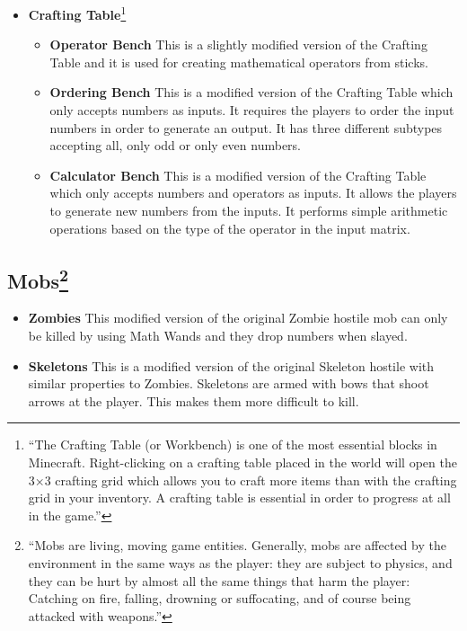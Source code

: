 \begin{itemize}
\large \item \textbf{Crafting Table}\footnote{``The Crafting Table (or Workbench) is one of the most essential blocks in Minecraft. Right-clicking on a crafting table placed in the world will open the 3×3 crafting grid which allows you to craft more items than with the crafting grid in your inventory. A crafting table is essential in order to progress at all in the game.''\cite{website:minecraft-table}}

\normalsize
\begin{itemize}
\item \textbf{Operator Bench}
\newline
\normalsize This is a slightly modified version of the Crafting Table and it is used for creating mathematical operators from sticks.

\item \textbf{Ordering Bench}
\newline
\normalsize This is a modified version of the Crafting Table which only accepts numbers as inputs. It requires the players to order the input numbers in order to generate an output. It has three different subtypes accepting all, only odd or only even numbers.

\item \textbf{Calculator Bench}
\newline
\normalsize This is a modified version of the Crafting Table which only accepts numbers and operators as inputs. It allows the players to generate new numbers from the inputs. It performs simple arithmetic operations based on the type of the operator in the input matrix.
\end{itemize}
\end{itemize}

\subsection[Mobs]{Mobs\footnote{``Mobs are living, moving game entities. Generally, mobs are affected by the environment in the same ways as the player: they are subject to physics, and they can be hurt by almost all the same things that harm the player: Catching on fire, falling, drowning or suffocating, and of course being attacked with weapons.''\cite{website:minecraft-mobs}}}

\begin{itemize}
\item \textbf{Zombies}
\newline
\normalsize This modified version of the original Zombie hostile mob can only be killed by using Math Wands and they drop numbers when slayed.

\item \textbf{Skeletons}
\newline
\normalsize This is a modified version of the original Skeleton hostile with similar properties to Zombies. Skeletons are armed with bows that shoot arrows at the player. This makes them more difficult to kill.
\newline
\end{itemize}

